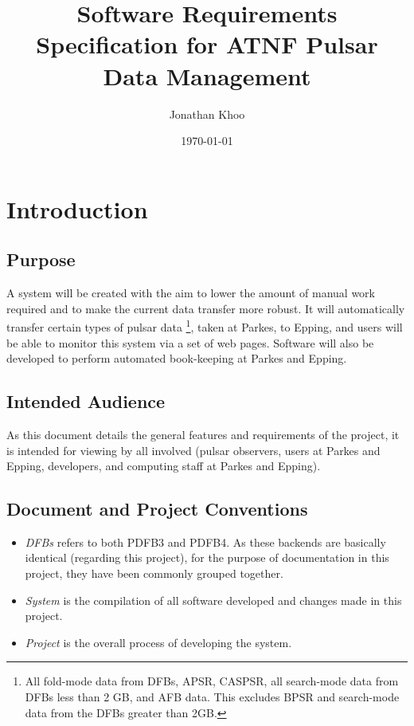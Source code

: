 \documentclass[a4paper,11pt]{article}
\begin{document}
\title{Software Requirements Specification for ATNF Pulsar Data Management}
\author{Jonathan Khoo}
\date{\today}
\maketitle
\clearpage

\section{Introduction}


\subsection{Purpose}
A system will be created with the aim to lower the amount of manual work required and to make the current data transfer more robust. It will automatically transfer certain types of pulsar data \footnote{All fold-mode data from DFBs, APSR, CASPSR, all search-mode data from DFBs less than 2 GB, and AFB data. This excludes BPSR and search-mode data from the DFBs greater than 2GB.}, taken at Parkes, to Epping, and users will be able to monitor this system via a set of web pages. Software will also be developed to perform automated book-keeping at Parkes and Epping.

\subsection{Intended Audience}
As this document details the general features and requirements of the project, it is intended for viewing by all involved (pulsar observers, users at Parkes and Epping, developers, and computing staff at Parkes and Epping).

\subsection{Document and Project Conventions}
\begin{itemize}
\item \emph{DFBs} refers to both PDFB3 and PDFB4. As these backends are basically identical (regarding this project), for the purpose of documentation in this project, they have been commonly grouped together.
\item \emph{System} is the compilation of all software developed and changes made in this project.
\item \emph{Project} is the overall process of developing the system.
\end{itemize}
\end{document}
